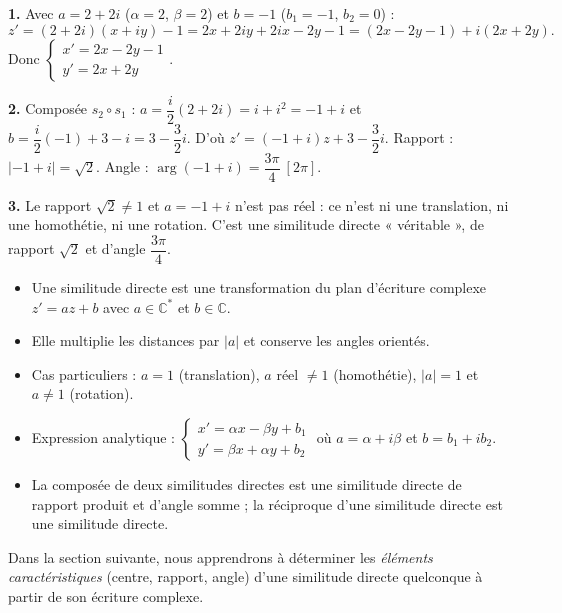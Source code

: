 \documentclass[11pt]{article}
\newcommand{\cle}[1]{{\popxbold\color{popdark}#1}}
\begin{document}
\begin{corrige}
\textbf{1.} Avec $a = 2 + 2i$ ($\alpha = 2$, $\beta = 2$) et $b = -1$ ($b_1 = -1$, $b_2 = 0$) :
\[ z' = (2+2i)(x+iy) - 1 = 2x + 2iy + 2ix - 2y - 1 = (2x - 2y - 1) + i(2x + 2y). \]
Donc $\begin{cases} x' = 2x - 2y - 1 \\ y' = 2x + 2y \end{cases}$.

\textbf{2.} Composée $s_2 \circ s_1$ : $a = \dfrac{i}{2}(2 + 2i) = i + i^2 = -1 + i$ et $b = \dfrac{i}{2}(-1) + 3 - i = 3 - \dfrac{3}{2}i$. D'où $z' = (-1+i)z + 3 - \dfrac{3}{2}i$. Rapport : $|-1+i| = \sqrt{2}$. Angle : $\arg(-1+i) = \dfrac{3\pi}{4} \ [2\pi]$.

\textbf{3.} Le rapport $\sqrt{2} \neq 1$ et $a = -1 + i$ n'est pas réel : ce n'est ni une translation, ni une homothétie, ni une rotation. C'est une similitude directe « véritable », de rapport $\sqrt{2}$ et d'angle $\dfrac{3\pi}{4}$.
\end{corrige}

\begin{aretenir}
\begin{itemize}
\item Une \cle{similitude directe} est une transformation du plan d'écriture complexe $z' = az + b$ avec $a \in \mathbb{C}^{*}$ et $b \in \mathbb{C}$.
\item Elle multiplie les distances par $|a|$ et conserve les angles orientés.
\item Cas particuliers : $a = 1$ (translation), $a$ réel $\neq 1$ (homothétie), $|a| = 1$ et $a \neq 1$ (rotation).
\item Expression analytique : $\begin{cases} x' = \alpha x - \beta y + b_1 \\ y' = \beta x + \alpha y + b_2 \end{cases}$ où $a = \alpha + i\beta$ et $b = b_1 + ib_2$.
\item La composée de deux similitudes directes est une similitude directe de rapport produit et d'angle somme ; la réciproque d'une similitude directe est une similitude directe.
\end{itemize}
Dans la section suivante, nous apprendrons à déterminer les \emph{éléments caractéristiques} (centre, rapport, angle) d'une similitude directe quelconque à partir de son écriture complexe.
\end{aretenir}
\end{document}
